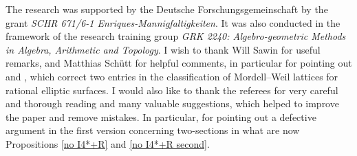 \begin{acknowledgement}
The research was supported by the Deutsche Forschungsgemeinschaft by the grant  \emph{SCHR 671/6-1 Enriques-Mannigfaltigkeiten}.
It was also conducted  in the framework of the   research training group
\emph{GRK 2240: Algebro-geometric Methods in Algebra, Arithmetic and Topology}.
I wish to thank Will Sawin for useful remarks, and Matthias Sch\"utt for helpful comments, in particular for
pointing out  \cite{Shioda-1992} and \cite{Schuett-Shioda-2019},
which correct two entries in the classification of Mordell--Weil lattices for rational elliptic surfaces.
I would also like to thank the referees for very  careful and thorough reading and many valuable suggestions, which helped to improve the paper
and remove mistakes. In particular, for pointing out a defective argument in the first version concerning   two-sections in
what are  now Propositions \ref{no I4*+R} and   \ref{no I4*+R second}.
\end{acknowledgement}


